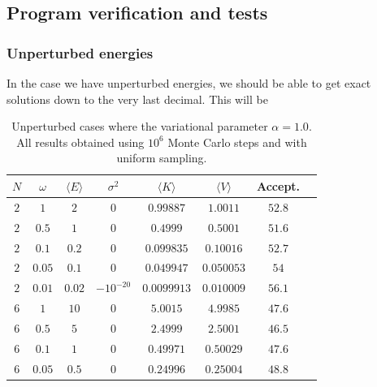 \documentclass[11pt]{article}
\begin{document}
\subsection{Program verification and tests}
\subsubsection{Unperturbed energies}
In the case we have unperturbed energies, we should be able to get exact solutions down to the very last decimal. This will be 

\begin{table}[H]
	\centering
	\caption{Unperturbed cases where the variational parameter $\alpha=1.0$. All results obtained using $10^6$ Monte Carlo steps and with uniform sampling.}
	\begin{tabular}{c c c c c c c c}
		\\ \hline \hline
		$N$ 			  &       $\omega$   &$\langle E \rangle$ &     $\sigma^2$ &$\langle K\rangle$ &$\langle V \rangle$ &     Accept. \\ \hline
		$              2$ &$              1$ &$              2$ &$              0$ &$        0.99887$ &$         1.0011$ & $           52.8$ \\ 
		$              2$ &$            0.5$ &$              1$ &$              0$ &$         0.4999$ &$         0.5001$ & $           51.6$ \\ 
		$              2$ &$            0.1$ &$            0.2$ &$              0$ &$       0.099835$ &$        0.10016$ & $           52.7$ \\ 
		$              2$ &$           0.05$ &$            0.1$ &$              0$ &$       0.049947$ &$       0.050053$ & $             54$ \\ 
		$              2$ &$           0.01$ &$           0.02$ &$      -10^{-20}$ &$      0.0099913$ &$       0.010009$ & $           56.1$ \\ 
		$              6$ &$              1$ &$             10$ &$              0$ &$         5.0015$ &$         4.9985$ & $           47.6$ \\ 
		$              6$ &$            0.5$ &$              5$ &$              0$ &$         2.4999$ &$         2.5001$ & $           46.5$ \\ 
		$              6$ &$            0.1$ &$              1$ &$              0$ &$        0.49971$ &$        0.50029$ & $           47.6$ \\ 
		$              6$ &$           0.05$ &$            0.5$ &$              0$ &$        0.24996$ &$        0.25004$ & $           48.8$ \\ 

\end{tabular}
\end{table}
\end{document}
